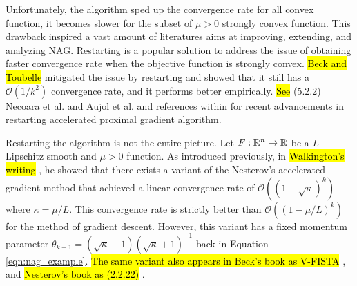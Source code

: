 \documentclass[12pt]{article}
\begin{document}
    Unfortunately, the algorithm sped up the convergence rate for all convex function, it becomes slower for the subset of $\mu > 0$ strongly convex function. 
    This drawback inspired a vast amount of literatures aims at improving, extending, and analyzing NAG. 
    Restarting is a popular solution to address the issue of obtaining faster convergence rate when the objective function is strongly convex. 
    {\hl{Beck and Toubelle}} \cite{beck_fast_2009}
    mitigated the issue by restarting and showed that it still has a $\mathcal O(1/k^2)$ convergence rate, and it performs better empirically. 
    {\hl{See} (5.2.2) Necoara et al. \cite{necoara_linear_2019} and Aujol et al. \cite{aujol_parameter-free_2024}}
    and references within for recent advancements in restarting accelerated proximal gradient algorithm.
    \par
    Restarting the algorithm is not the entire picture. 
    Let $F:\mathbb R^n \rightarrow \mathbb R$ be a $L$ Lipschitz smooth and $\mu > 0$ function. 
    As introduced previously, in 
    {\hl{Walkington's writing}} \cite{noel_nesterovs_nodate}, 
    he showed that there exists a variant of the Nesterov's accelerated gradient method that achieved a linear convergence rate of $\mathcal O((1 - \sqrt{\kappa})^k)$ where $\kappa = \mu/L$. 
    This convergence rate is strictly better than $\mathcal O((1 - \mu/L)^k)$ for the method of gradient descent. 
    However, this variant has a fixed momentum parameter $\theta_{k + 1} = (\sqrt{\kappa} - 1)(\sqrt{\kappa} + 1)^{-1}$ back in Equation \ref{eqn:nag_example}. 
    {\hl{
        The same variant also appears in Beck's book as V-FISTA} \cite[(10.7.7)]{beck_first-order_2017}, and \hl{Nesterov's book as (2.2.22)} \cite{nesterov_lectures_2018}.
    }
\end{document}
